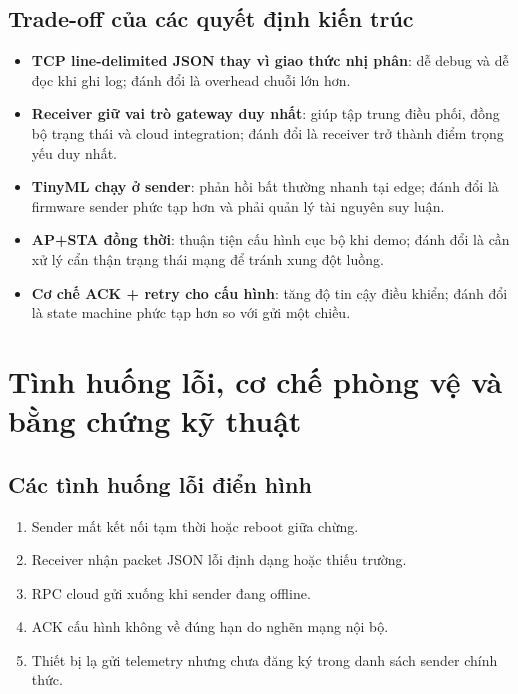 \documentclass[12pt,a4paper]{report}
\begin{document}
\subsection{Trade-off của các quyết định kiến trúc}
\begin{itemize}
    \item \textbf{TCP line-delimited JSON thay vì giao thức nhị phân}: dễ debug và dễ đọc khi ghi log; đánh đổi là overhead chuỗi lớn hơn.
    \item \textbf{Receiver giữ vai trò gateway duy nhất}: giúp tập trung điều phối, đồng bộ trạng thái và cloud integration; đánh đổi là receiver trở thành điểm trọng yếu duy nhất.
    \item \textbf{TinyML chạy ở sender}: phản hồi bất thường nhanh tại edge; đánh đổi là firmware sender phức tạp hơn và phải quản lý tài nguyên suy luận.
    \item \textbf{AP+STA đồng thời}: thuận tiện cấu hình cục bộ khi demo; đánh đổi là cần xử lý cẩn thận trạng thái mạng để tránh xung đột luồng.
    \item \textbf{Cơ chế ACK + retry cho cấu hình}: tăng độ tin cậy điều khiển; đánh đổi là state machine phức tạp hơn so với gửi một chiều.
\end{itemize}

\section{Tình huống lỗi, cơ chế phòng vệ và bằng chứng kỹ thuật}

\subsection{Các tình huống lỗi điển hình}
\begin{enumerate}
    \item Sender mất kết nối tạm thời hoặc reboot giữa chừng.
    \item Receiver nhận packet JSON lỗi định dạng hoặc thiếu trường.
    \item RPC cloud gửi xuống khi sender đang offline.
    \item ACK cấu hình không về đúng hạn do nghẽn mạng nội bộ.
    \item Thiết bị lạ gửi telemetry nhưng chưa đăng ký trong danh sách sender chính thức.
\end{enumerate}
\end{document}
